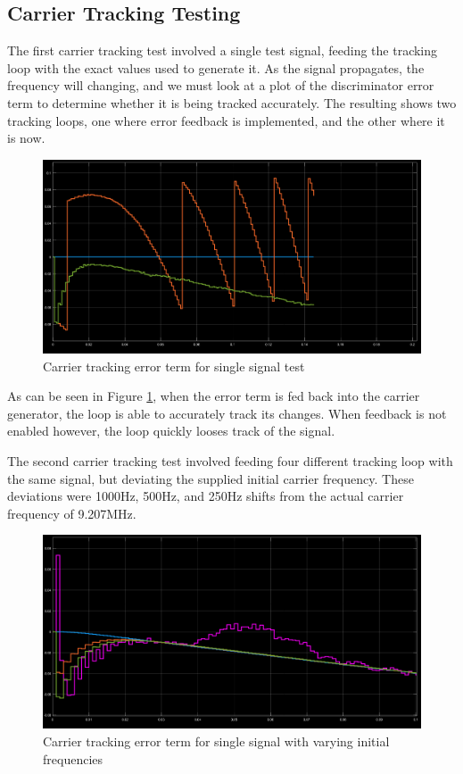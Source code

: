 \documentclass[11pt]{article}
\numberwithin{equation}{subsection}
\begin{document}
	\subsection{Carrier Tracking Testing}
	
	The first carrier tracking test involved a single test signal, feeding the tracking loop with the exact values used to generate it. As the signal propagates, the frequency will changing, and we must look at a plot of the discriminator error term to determine whether it is being tracked accurately. The resulting shows two tracking loops, one where error feedback is implemented, and the other where it is now.
	
	\begin{figure}
		\centering
		\label{Carrier_Tracking_Test_1}
		\includegraphics[width=\textwidth]{Carrier_Tracking_Test_1}
		\caption{Carrier tracking error term for single signal test}
		\label{carrt1}
	\end{figure}
	
	As can be seen in Figure \ref{carrt1}, when the error term is fed back into the carrier generator, the loop is able to accurately track its changes. When feedback is not enabled however, the loop quickly looses track of the signal.
	
	The second carrier tracking test involved feeding four different tracking loop with the same signal, but deviating the supplied initial carrier frequency. These deviations were 1000Hz, 500Hz, and 250Hz shifts from the actual carrier frequency of 9.207MHz.
	
	\begin{figure}
		\centering
		\label{Carrier_Tracking_Test_2}
		\includegraphics[width=\textwidth]{Carrier_Tracking_Test_2}
		\caption{Carrier tracking error term for single signal with varying initial frequencies}
		\label{carrt2}
	\end{figure}
	
\end{document}

